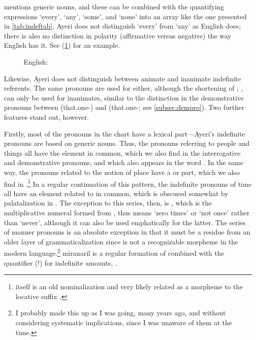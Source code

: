 \citet{haspelmath1997} mentions generic nouns, and these can be combined with
the quantifying expressions `every', `any', `some', and `none' into an array
like the one presented in \autoref{tab:indeftab}. Ayeri does not distinguish
`every' from `any' as English does; there is also no distinction in polarity
(affirmative versus negative) the way English has it. See (\ref{ex:englpol})
for an example.

\begin{figure}[h]
\pex\label{ex:englpol}%
	English:
	\a\ljudge* {}
	\a {}
\xe
\end{figure}

Likewise, Ayeri does not distinguish between animate and inanimate indefinite 
referents. The same pronouns are used for either, although the shortening of 
, , can only be used for 
inanimates, similar to the distinction in the demonstrative pronouns between 
 (that.one-\Aarg{}) and 
 (that.one-\AargI{}; see 
\autoref{subsec:dempro}). Two further features stand out, however.

\label{indefprocomp}
Firstly, most of the pronouns in the chart have a lexical part---Ayeri's
indefinite pronouns are based on generic nouns. Thus, the pronouns referring to
people and things all have the  element in common, which we
also find in the interrogative and demonstrative pronouns, and which also
appears in the word . In the same way, the pronouns
related to the notion of place have a  or  part,
which we also find in .\footnote{ itself
is an old nominalization and very likely related as a morpheme to the locative
suffix .} In a regular continuation of this pattern, the
indefinite pronouns of time all have an element related to
 in common, which is obscured somewhat by palatalization
in . The exception to this series, then, is
, which is the multiplicative numeral formed from
, thus means `zero times' or `not once' rather than 
`never', although it can also be used emphatically for the latter. The series
of manner pronouns is an absolute exception in that it must be a residue from
an older layer of grammaticalization since  is not a
recognizable morpheme in the modern language.\footnote{I probably made this up
as I was going, many years ago, and without considering systematic
implications, since I was unaware of them at the time.} 
{miranaril} is a regular formation of  combined
with the quantifier (!) for indefinite amounts, .

